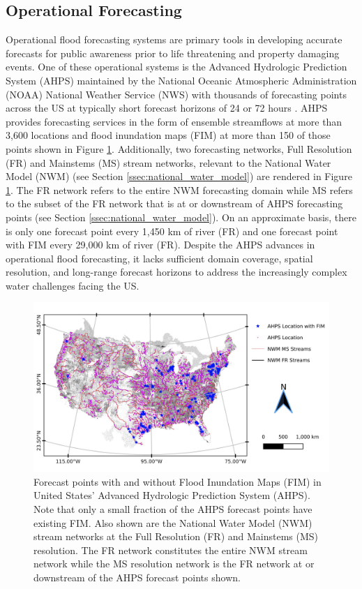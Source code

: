 \subsection{Operational Forecasting}
%
Operational flood forecasting systems are primary tools in developing accurate forecasts for public awareness prior to life threatening and property damaging events. 
One of these operational systems is the Advanced Hydrologic Prediction System (AHPS) maintained by the National Oceanic Atmospheric Administration (NOAA) National Weather Service (NWS) with thousands of forecasting points across the US at typically short forecast horizons of 24 or 72 hours \cite{mcenery2005noaa}.
AHPS provides forecasting services in the form of ensemble streamflows at more than 3,600 locations and flood inundation maps (FIM) at more than 150 of those points shown in Figure \ref{fig:forecast_points}.
Additionally, two forecasting networks, Full Resolution (FR) and Mainstems (MS) stream networks, relevant to the National Water Model (NWM) (see Section \ref{ssec:national_water_model}) are rendered in Figure \ref{fig:forecast_points}.
The FR network refers to the entire NWM forecasting domain while MS refers to the subset of the FR network that is at or downstream of AHPS forecasting points (see Section \ref{ssec:national_water_model}).
On an approximate basis, there is only one forecast point every 1,450 km of river (FR) and one forecast point with FIM every 29,000 km of river (FR).
Despite the AHPS advances in operational flood forecasting, it lacks sufficient domain coverage, spatial resolution, and long-range forecast horizons to address the increasingly complex water challenges facing the US.
%
\begin{figure}[H]
\centering
\includegraphics[scale=1.0]{figures/forecast_points.jpg}
\caption{Forecast points with and without Flood Inundation Maps (FIM) in United States' Advanced Hydrologic Prediction System (AHPS).
Note that only a small fraction of the AHPS forecast points have existing FIM.
Also shown are the National Water Model (NWM) stream networks at the Full Resolution (FR) and Mainstems (MS) resolution.
The FR network constitutes the entire NWM stream network while the MS resolution network is the FR network at or downstream of the AHPS forecast points shown.
}
\label{fig:forecast_points}
\end{figure}
%
